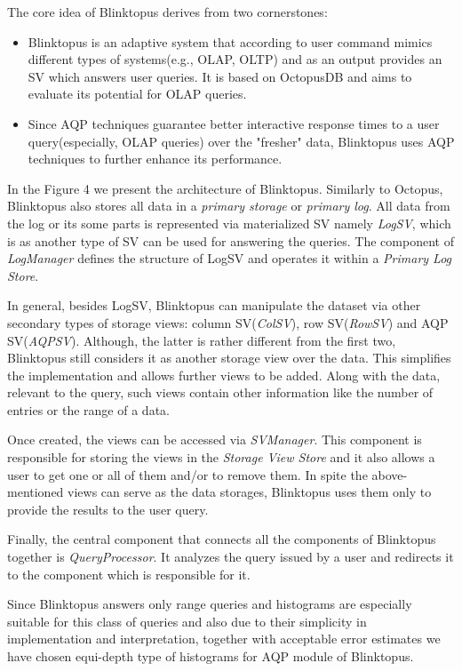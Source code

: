 \documentclass[10pt, conference, compsocconf]{IEEEtran}
\begin{document}
The core idea of Blinktopus derives from two cornerstones:
\begin{itemize}
\item{Blinktopus is an adaptive system that according to user command mimics different types of systems(e.g., OLAP, OLTP) and as an output provides an SV which answers user queries. It is based on OctopusDB and aims to evaluate its potential for OLAP queries.}
\item{Since AQP techniques guarantee better interactive response times to a user query(especially, OLAP queries) over the "fresher" data, Blinktopus uses AQP techniques to further enhance its performance.}
\end{itemize}

In the Figure 4 we present the architecture of Blinktopus. Similarly to Octopus, Blinktopus also stores all data in a \textit{primary storage} or \textit{primary log}.
All data from the log or its some parts is represented via materialized SV namely \textit{LogSV}, which is as another type of SV can be used for answering the queries. The component of \textit{LogManager} defines the structure of LogSV and operates it within a \textit{Primary Log Store}. 

In general, besides LogSV, Blinktopus can manipulate the dataset via other secondary types of storage views: column SV(\textit{ColSV}), row SV(\textit{RowSV}) and AQP SV(\textit{AQPSV}). Although, the latter is rather different from the first two, Blinktopus still considers it as another storage view over the data. This simplifies the implementation and allows further views to be added. Along with the data, relevant to the query, such views contain other information like the number of entries or the range of a data. 

Once created, the views can be accessed via \textit{SVManager}. This component is responsible for storing the views in the \textit{Storage View Store} and it also allows a user to get one or all of them and/or to remove them.
In spite the above-mentioned views can serve as the data storages, Blinktopus uses them only to provide the results to the user query. 

Finally, the central component that connects all the components of Blinktopus together is \textit{QueryProcessor}. It analyzes the query issued by a user and redirects it to the component which is responsible for it.

Since Blinktopus answers only range queries and histograms are especially suitable for this class of queries and also due to their simplicity in implementation and interpretation, together with acceptable error estimates we have chosen equi-depth type of histograms for AQP module of Blinktopus. 
\end{document}
